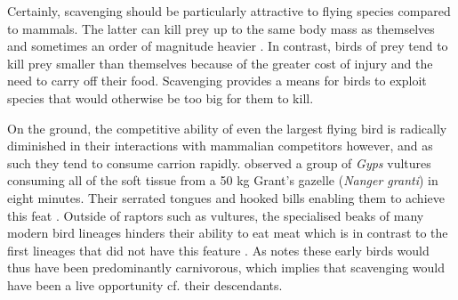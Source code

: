 \documentclass[a4paper,12pt]{article}
\begin{document}
Certainly, scavenging should be particularly attractive to flying species compared to mammals. %
The latter can kill prey up to the same body mass as themselves and sometimes an order of magnitude heavier \citep[e.g. socially hunting lions; ][]{owen2008predator}.
In contrast, birds of prey tend to kill prey smaller than themselves \citep{slagsvold2007prey} because of the greater cost of injury and the need to carry off their food.
Scavenging provides a means for birds to exploit species that would otherwise be too big for them to kill.

On the ground, the competitive ability of even the largest flying bird is radically diminished in their interactions with mammalian competitors however, and as such they tend to consume carrion rapidly. %
\cite{houston1974role} observed a group of \textit{Gyps} vultures consuming all of the soft tissue from a 50 kg Grant’s gazelle (\textit{Nanger granti}) in eight minutes. 
Their serrated tongues and hooked bills enabling them to achieve this feat \citep{houston1975digestive}. 
Outside of raptors such as vultures, the specialised beaks of many modern bird lineages hinders their ability to eat meat which is in contrast to the first lineages that did not have this feature \citep{martyniuk2012field}. 
As \cite{martyniuk2012field} notes these early birds would thus have been predominantly carnivorous, which implies that scavenging would have been a live opportunity cf. their descendants. 
\end{document}
